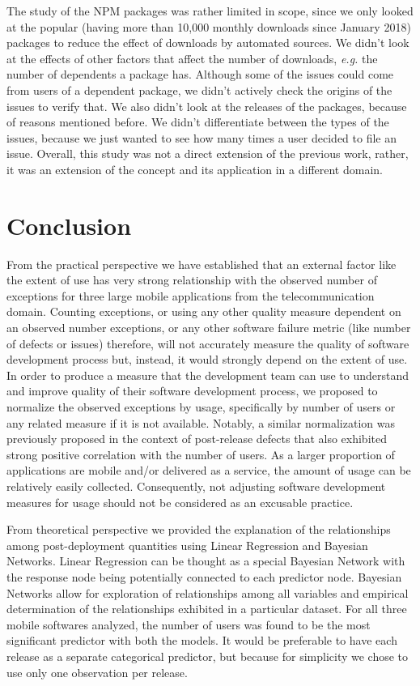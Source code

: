 \documentclass[smallcondensed]{svjour3}     %
\begin{document}
The study of the NPM packages was rather limited in scope, since we
only looked at the popular (having more than 10,000 monthly downloads 
since January 2018) packages to reduce the effect of downloads by 
automated sources. We didn't look at the effects of other factors 
that affect the number of downloads, \emph{e.g.} the number of 
dependents a package has. Although some of the issues could come 
from users of a dependent package, we didn't actively check the
origins of the issues to verify that. We also didn't look at the
releases of the packages, because of reasons mentioned before.
We didn't differentiate between the types of the issues, because we 
just wanted to see how many times a user decided to file an issue.
Overall, this study was not a direct extension of the previous work,
rather, it was an extension of the concept and its application in a different domain.


\vspace{-10pt}
\section{Conclusion}\label{s:conclusion}

From the practical perspective we have established
that an external factor like the extent of use has very 
strong relationship with the observed number
of exceptions for three large mobile applications from 
the telecommunication domain. Counting exceptions, or using any other quality 
measure dependent on an observed number exceptions, or any other 
software failure metric (like number of defects or issues) 
therefore, will not accurately measure the quality of software
development process but, instead, it would strongly depend on the
extent of use. In order to produce a measure that the development
team can use to understand and improve quality of their software
development process, we proposed to normalize the observed exceptions by usage, 
specifically by number of users or any related measure if it is not 
available. Notably, a similar
normalization was previously proposed in the context of post-release
defects that also exhibited strong positive correlation with the
number of users.  As a larger proportion of applications are mobile
and/or delivered as a service, the amount of usage can be relatively
easily collected.  Consequently, not adjusting software
development measures for usage should not be considered as an
excusable practice.

From theoretical perspective we provided the explanation of the
relationships among post-deployment quantities using Linear
Regression and Bayesian Networks. Linear Regression can be thought
as a special Bayesian Network with the response node being
potentially connected to each predictor node. Bayesian Networks
allow for exploration of relationships among all variables and
empirical determination of the relationships exhibited in a
particular dataset.  For all three mobile softwares analyzed, the number of users was found to be the most significant predictor with both the models. It would be preferable to have each release as a separate
categorical predictor, but because for simplicity we chose to use
only one observation per release.
\end{document}
